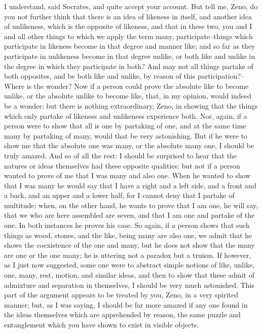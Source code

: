 I understand, said Socrates, and quite accept your account. But tell
me, Zeno, do you not further think that there is an idea of likeness
in itself, and another idea of unlikeness, which is the opposite of
likeness, and that in these two, you and I and all other things to
which we apply the term many, participate--things which participate
in likeness become in that degree and manner like; and so far as they
participate in unlikeness become in that degree unlike, or both like and
unlike in the degree in which they participate in both? And may not all
things partake of both opposites, and be both like and unlike, by reason
of this participation?--Where is the wonder? Now if a person could prove
the absolute like to become unlike, or the absolute unlike to become
like, that, in my opinion, would indeed be a wonder; but there is
nothing extraordinary, Zeno, in showing that the things which only
partake of likeness and unlikeness experience both. Nor, again, if a
person were to show that all is one by partaking of one, and at the same
time many by partaking of many, would that be very astonishing. But if
he were to show me that the absolute one was many, or the absolute
many one, I should be truly amazed. And so of all the rest: I should
be surprised to hear that the natures or ideas themselves had these
opposite qualities; but not if a person wanted to prove of me that I was
many and also one. When he wanted to show that I was many he would say
that I have a right and a left side, and a front and a back, and an
upper and a lower half, for I cannot deny that I partake of multitude;
when, on the other hand, he wants to prove that I am one, he will say,
that we who are here assembled are seven, and that I am one and partake
of the one. In both instances he proves his case. So again, if a person
shows that such things as wood, stones, and the like, being many are
also one, we admit that he shows the coexistence of the one and many,
but he does not show that the many are one or the one many; he
is uttering not a paradox but a truism. If however, as I just now
suggested, some one were to abstract simple notions of like, unlike,
one, many, rest, motion, and similar ideas, and then to show that these
admit of admixture and separation in themselves, I should be very much
astonished. This part of the argument appears to be treated by you,
Zeno, in a very spirited manner; but, as I was saying, I should be
far more amazed if any one found in the ideas themselves which are
apprehended by reason, the same puzzle and entanglement which you have
shown to exist in visible objects.

